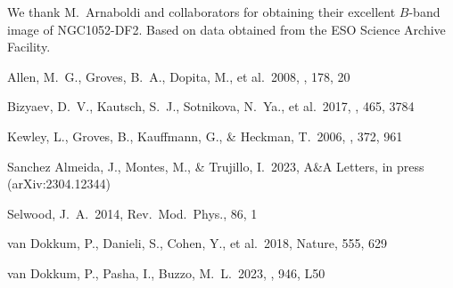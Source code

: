 \documentclass[RNAAS]{aastex62}
\begin{document}
\acknowledgments
We thank M.\ Arnaboldi and collaborators for obtaining their excellent $B$-band image
of NGC1052-DF2. Based on data obtained from the ESO Science Archive Facility.


\begin{thebibliography}{}

 Allen, M.~G., Groves, B.~A., Dopita, M., et al.\ 2008,
\apjs, 178, 20


 Bizyaev, D.~V., Kautsch, S.~J., Sotnikova, N.~Ya., et al.\ 2017,
\mnras, 465, 3784

 Kewley, L., Groves, B., Kauffmann, G., \& Heckman, T.\ 2006,
\mnras, 372, 961








 {Sanchez Almeida}, J., Montes, M., \& Trujillo, I.\ 2023,
A\&A Letters, in press (arXiv:2304.12344)

 Selwood, J.~A.\ 2014, Rev.\ Mod.\ Phys., 86, 1



 van Dokkum, P., Danieli, S.,
Cohen, Y., et al.\ 2018, Nature, 555, 629


 van Dokkum, P., Pasha, I., Buzzo, M.~L.\ 2023,
\apjl, 946, L50



\end{thebibliography}
\end{document}
